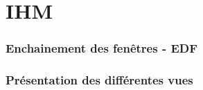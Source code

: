 \part{IHM}
\setcounter{section}{0}

\section{Enchainement des fenêtres - EDF}

\section{Présentation des différentes vues}
